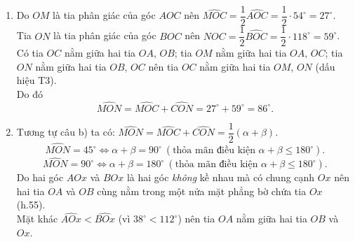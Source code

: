 \begin{vd}
{\begin{enumerate}
{
			}
			\item Do $OM$ là tia phân giác của góc $AOC$ nên $\widehat{MOC}=\dfrac{1}{2}\widehat{AOC}=\dfrac{1}{2}\cdot 54^\circ=27^\circ$.\\
			Tia $ON$ là tia phân giác của góc $BOC$ nên $NOC = \dfrac{1}{2}\widehat{BOC}=\dfrac{1}{2}\cdot 118^\circ = 59^\circ$.\\
			Có tia $OC$ nằm giữa hai tia $OA$, $OB$; tia $OM$ nằm giữa hai tia $OA$, $OC$; tia $ON$ nằm giữa hai tia $OB$, $OC$ nên tia $OC$ nằm giữa hai tia $OM$, $ON$ (dấu hiệu T3).\\
			Do đó
			\[\widehat{MON}=\widehat{MOC}+\widehat{CON}=27^\circ +59^\circ = 86^\circ.\]
			\item Tương tự câu b) ta có: $\widehat{MON}=\widehat{MOC}+\widehat{CON}=\dfrac{1}{2}(\alpha+\beta)$.
			\[\widehat{MON}=45^\circ \Leftrightarrow \alpha+\beta = 90^\circ \ (\text{thỏa mãn điều kiện } \alpha + \beta \leq 180^\circ).\]
			\[\widehat{MON}=90^\circ \Leftrightarrow \alpha+\beta = 180^\circ \ (\text{thỏa mãn điều kiện } \alpha + \beta \leq 180^\circ).\]
			Do hai góc $AOx$ và $BOx$ là hai góc \textit{không} kề nhau mà có chung cạnh $Ox$ nên hai tia $OA$ và $OB$ cùng nằm trong một nửa mặt phẳng bờ chứa tia $Ox$ (h.55).\\
			Mặt khác $\widehat{AOx}<\widehat{BOx}$ (vì $38^\circ < 112^\circ$) nên tia $OA$ nằm giữa hai tia $OB$ và $Ox$.
		\end{enumerate}
	}
\end{vd}

